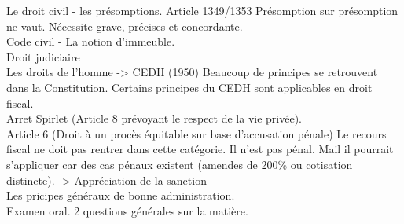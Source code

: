 \documentclass{book}
\begin{document}
Le droit civil - les présomptions. Article 1349/1353 Présomption sur présomption ne vaut. Nécessite grave, précises et concordante.\\

Code civil - La notion d'immeuble.\\

Droit judiciaire\\

Les droits de l'homme -> CEDH (1950) Beaucoup de principes se retrouvent dans la Constitution. Certains principes du CEDH sont applicables en droit fiscal. \\

Arret Spirlet (Article 8 prévoyant le respect de la vie privée).\\ 

Article 6 (Droit à un procès équitable sur base d'accusation pénale) Le recours fiscal ne doit pas rentrer dans cette catégorie. Il n'est pas pénal. Mail il pourrait s'appliquer car des cas pénaux existent (amendes de 200\% ou cotisation distincte). -> Appréciation de la sanction\\

Les pricipes généraux de bonne administration.\\

Examen oral. 2 questions générales sur la matière.
























   
\nocite{*}

\end{document}
